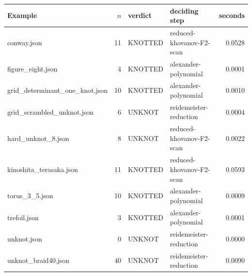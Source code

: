 \begin{tabular}{@{}lrllr@{}}
\toprule
Example & $n$ & verdict & deciding step & seconds \\
\midrule
conway.json & 11 & KNOTTED & reduced-khovanov-F2-scan & 0.0528 \\
figure\_eight.json & 4 & KNOTTED & alexander-polynomial & 0.0001 \\
grid\_determinant\_one\_knot.json & 10 & KNOTTED & alexander-polynomial & 0.0010 \\
grid\_scrambled\_unknot.json & 6 & UNKNOT & reidemeister-reduction & 0.0004 \\
hard\_unknot\_8.json & 8 & UNKNOT & reduced-khovanov-F2-scan & 0.0022 \\
kinoshita\_terasaka.json & 11 & KNOTTED & reduced-khovanov-F2-scan & 0.0593 \\
torus\_3\_5.json & 10 & KNOTTED & alexander-polynomial & 0.0009 \\
trefoil.json & 3 & KNOTTED & alexander-polynomial & 0.0001 \\
unknot.json & 0 & UNKNOT & reidemeister-reduction & 0.0000 \\
unknot\_braid40.json & 40 & UNKNOT & reidemeister-reduction & 0.0090 \\
\bottomrule
\end{tabular}
